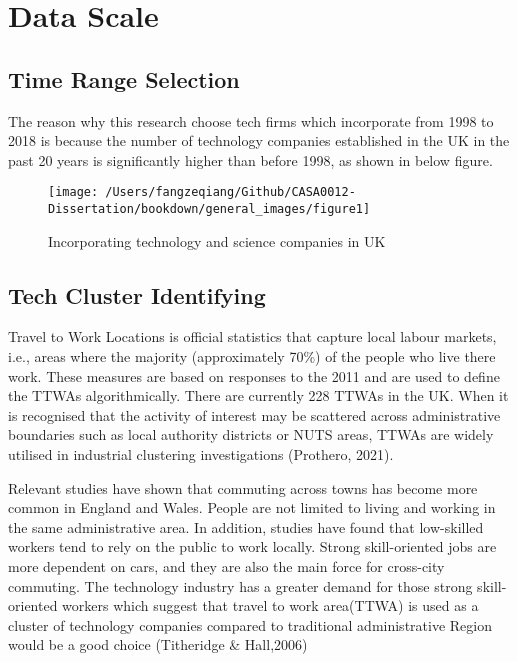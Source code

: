 \documentclass[
  12pt,
  oneside]{book}
\begin{document}
\hypertarget{data-scale}{%
\section{Data Scale}\label{data-scale}}

\hypertarget{time-range-selection}{%
\subsection{Time Range Selection}\label{time-range-selection}}

The reason why this research choose tech firms which incorporate from 1998 to 2018 is because the number of technology companies established in the UK in the past 20 years is significantly higher than before 1998, as shown in below figure.

\begin{figure}
\texttt{[image: /Users/fangzeqiang/Github/CASA0012-Dissertation/bookdown/general\_images/figure1]} \caption{Incorporating technology and science companies in UK}\label{fig:fig-1}
\end{figure}

\hypertarget{tech-cluster-identifying}{%
\subsection{Tech Cluster Identifying}\label{tech-cluster-identifying}}

Travel to Work Locations is official statistics that capture local labour markets, i.e., areas where the majority (approximately 70\%) of the people who live there work. These measures are based on responses to the 2011 and are used to define the TTWAs algorithmically. There are currently 228 TTWAs in the UK. When it is recognised that the activity of interest may be scattered across administrative boundaries such as local authority districts or NUTS areas, TTWAs are widely utilised in industrial clustering investigations (Prothero, 2021).

Relevant studies have shown that commuting across towns has become more common in England and Wales. People are not limited to living and working in the same administrative area. In addition, studies have found that low-skilled workers tend to rely on the public to work locally. Strong skill-oriented jobs are more dependent on cars, and they are also the main force for cross-city commuting. The technology industry has a greater demand for those strong skill-oriented workers which suggest that travel to work area(TTWA) is used as a cluster of technology companies compared to traditional administrative Region would be a good choice (Titheridge \& Hall,2006)
\end{document}
